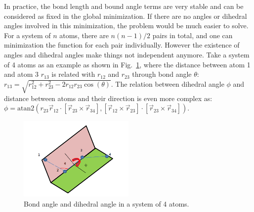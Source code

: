 In practice, the bond length and bound angle terms are very stable and can be considered as fixed in the global
minimization. If there are no angles or dihedral angles involved in this minimization, the problem would be much easier to solve.
For a system of $n$ atoms, there are $n(n-1)/2$ pairs in total, and one can minimization the function for each pair individually.
However the existence of angles and dihedral angles make things not independent anymore. Take a system of 4 atoms as an example as 
shown in Fig.~\ref{fig:3d}, where the distance between atom 1 and atom 3 $r_{13}$ is related with $r_{12} $ and $r_{23}$ through 
bond angle $\theta$: $r_{13}=\sqrt{r^2_{12}+r^2_{23}-2r_{12}r_{23}\cos(\theta)}$. The relation between dihedral angle $\phi$ and 
distance between atoms and their direction is even more complex as: 
$\phi=\mbox{atan2}( r_{23}\vec{r}_{12}\cdot[\vec{r}_{23}\times\vec{r}_{34}], [\vec{r}_{12}\times\vec{r}_{23}]\cdot [\vec{r}_{23}\times\vec{r}_{34}] )$.



\begin{figure} 
\begin{center} 
\includegraphics[width=0.5\textwidth]{3dangle.png}
\end{center}  
\caption{Bond angle and dihedral angle in a system of 4 atoms. }
\label{fig:3d}
\end{figure} 



